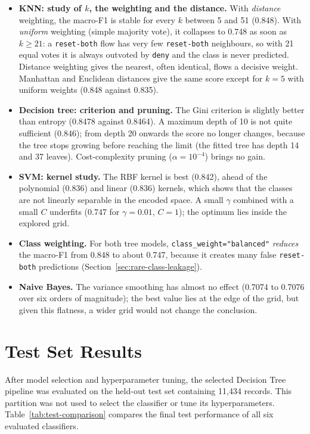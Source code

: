 \begin{itemize}
  \item \textbf{KNN: study of $k$, the weighting and the distance.} With \emph{distance} weighting, the macro-F1 is stable for every $k$ between 5 and 51 (0.848). With \emph{uniform} weighting (simple majority vote), it collapses to 0.748 as soon as $k \geq 21$: a \texttt{reset-both} flow has very few \texttt{reset-both} neighbours, so with 21 equal votes it is always outvoted by \texttt{deny} and the class is never predicted. Distance weighting gives the nearest, often identical, flows a decisive weight. Manhattan and Euclidean distances give the same score except for $k = 5$ with uniform weights (0.848 against 0.835).
  \item \textbf{Decision tree: criterion and pruning.} The Gini criterion is slightly better than entropy (0.8478 against 0.8464). A maximum depth of 10 is not quite sufficient (0.846); from depth 20 onwards the score no longer changes, because the tree stops growing before reaching the limit (the fitted tree has depth 14 and 37 leaves). Cost-complexity pruning ($\alpha = 10^{-4}$) brings no gain.
  \item \textbf{SVM: kernel study.} The RBF kernel is best (0.842), ahead of the polynomial (0.836) and linear (0.836) kernels, which shows that the classes are not linearly separable in the encoded space. A small $\gamma$ combined with a small $C$ underfits (0.747 for $\gamma = 0.01$, $C = 1$); the optimum lies inside the explored grid.
  \item \textbf{Class weighting.} For both tree models, \texttt{class\_weight="balanced"} \emph{reduces} the macro-F1 from 0.848 to about 0.747, because it creates many false \texttt{reset-both} predictions (Section~\ref{sec:rare-class-leakage}).
  \item \textbf{Naive Bayes.} The variance smoothing has almost no effect (0.7074 to 0.7076 over six orders of magnitude); the best value lies at the edge of the grid, but given this flatness, a wider grid would not change the conclusion.
\end{itemize}

\section{Test Set Results}\label{sec:test-set-results}

After model selection and hyperparameter tuning, the selected Decision Tree pipeline was evaluated on the held-out test set containing 11,434 records. This partition was not used to select the classifier or tune its hyperparameters. Table~\ref{tab:test-comparison} compares the final test performance of all six evaluated classifiers.

